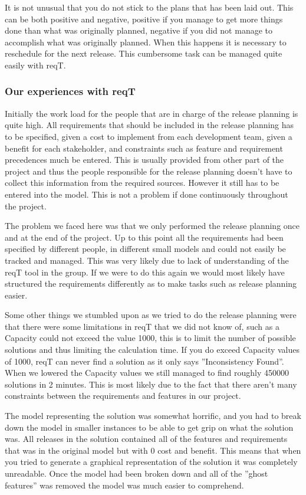 \documentclass[a4paper]{article}
\begin{document}
			It is not unusual that you do not stick to the plans that has been laid out. This can be both positive and negative, positive if you manage to get more things done than what was originally planned, negative if you did not manage to accomplish what was originally planned. When this happens it is necessary to reschedule for the next release. This cumbersome task can be managed quite easily with reqT.

			\subsubsection{Our experiences with reqT}
				Initially the work load for the people that are in charge of the release planning is quite high. All requirements that should be included in the release planning has to be specified, given a cost to implement from each development team, given a benefit for each stakeholder, and constraints such as feature and requirement precedences much be entered. This is usually provided from other part of the project and thus the people responsible for the release planning doesn't have to collect this information from the required sources. However it still has to be entered into the model. This is not a problem if done continuously throughout the project.

				The problem we faced here was that we only performed the release planning once and at the end of the project. Up to this point all the requirements had been specified by different people, in different small models and could not easily be tracked and managed. This was very likely due to lack of understanding of the reqT tool in the group. If we were to do this again we would most likely have structured the requirements differently as to make tasks such as release planning easier.

				Some other things we stumbled upon as we tried to do the release planning were that there were some limitations in reqT that we did not know of, such as a Capacity could not exceed the value 1000, this is to limit the number of possible solutions and thus limiting the calculation time. If you do exceed Capacity values of 1000, reqT can never find a solution as it only says ''Inconsistency Found''. When we lowered the Capacity values we still managed to find roughly 450000 solutions in 2 minutes. This is most likely due to the fact that there aren't many constraints between the requirements and features in our project.

				The model representing the solution was somewhat horrific, and you had to break down the model in smaller instances to be able to get grip on what the solution was. All releases in the solution contained all of the features and requirements that was in the original model but with 0 cost and benefit. This means that when you tried to generate a graphical representation of the solution it was completely unreadable. Once the model had been broken down and all of the ''ghost features'' was removed the model was much easier to comprehend.
\end{document}
